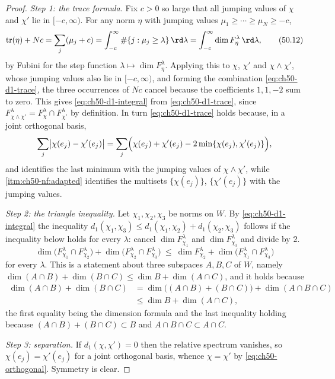 \begin{proof}
\emph{Step 1: the trace formula.}  Fix $c>0$ so large that all jumping
values of $\chi$ and $\chi'$ lie in $[-c,\infty)$.  For any norm
$\eta$ with jumping values $\mu_1\ge\cdots\ge\mu_N\ge-c$,
\[
 \operatorname{tr}(\eta)+Nc
 =\sum_j(\mu_j+c)
 =\int_{-c}^{\infty}\#\{j:\mu_j\ge\lambda\}\,\rd\lambda
 =\int_{-c}^{\infty}\dim F^\lambda_\eta\,\rd\lambda,
\tag{50.12}\label{eq:ch50-trace-layer}
\]
by Fubini for the step function $\lambda\mapsto\dim F^\lambda_\eta$.
Applying this to $\chi$, $\chi'$ and $\chi\wedge\chi'$, whose jumping
values also lie in $[-c,\infty)$, and forming the combination
\eqref{eq:ch50-d1-trace}, the three occurrences of $Nc$ cancel because
the coefficients $1,1,-2$ sum to zero.  This gives
\eqref{eq:ch50-d1-integral} from \eqref{eq:ch50-d1-trace}, since
$F^\lambda_{\chi\wedge\chi'}=F^\lambda_\chi\cap F^\lambda_{\chi'}$ by
definition.  In turn \eqref{eq:ch50-d1-trace} holds because, in a joint
orthogonal basis,
\[
 \sum_j\bigl|\chi(e_j)-\chi'(e_j)\bigr|
 =\sum_j\Bigl(\chi(e_j)+\chi'(e_j)
      -2\min\{\chi(e_j),\chi'(e_j)\}\Bigr),
\]
and  identifies the last minimum with the jumping
values of $\chi\wedge\chi'$, while
\,\cref{itm:ch50-nf:adapted} identifies
the multisets $\{\chi(e_j)\}$, $\{\chi'(e_j)\}$ with the jumping
values.

\emph{Step 2: the triangle inequality.}  Let $\chi_1,\chi_2,\chi_3$ be
norms on $W$.  By \eqref{eq:ch50-d1-integral} the inequality
$d_1(\chi_1,\chi_3)\le d_1(\chi_1,\chi_2)+d_1(\chi_2,\chi_3)$ follows
if the inequality below holds for every $\lambda$: cancel
$\dim F_{\chi_1}^\lambda$ and $\dim F^\lambda_{\chi_3}$ and divide by $2$.
\[
 \dim\bigl(F^\lambda_{\chi_1}\cap F^\lambda_{\chi_2}\bigr)
 +\dim\bigl(F^\lambda_{\chi_2}\cap F^\lambda_{\chi_3}\bigr)
 \ \le\
 \dim F^\lambda_{\chi_2}
 +\dim\bigl(F^\lambda_{\chi_1}\cap F^\lambda_{\chi_3}\bigr)
\tag{50.13}\label{eq:ch50-three-subspaces}
\]
for every $\lambda$.  This is a statement about three subspaces
$A,B,C$ of $W$, namely
$\dim(A\cap B)+\dim(B\cap C)\le\dim B+\dim(A\cap C)$, and it holds
because
\[
 \begin{split}
 \dim(A\cap B)+\dim(B\cap C)
 &=\dim\bigl((A\cap B)+(B\cap C)\bigr)+\dim(A\cap B\cap C)\\
 &\le\dim B+\dim(A\cap C),
 \end{split}
\]
the first equality being the dimension formula and the last inequality
holding because $(A\cap B)+(B\cap C)\subset B$ and
$A\cap B\cap C\subset A\cap C$.

\emph{Step 3: separation.}  If $d_1(\chi,\chi')=0$ then the relative
spectrum vanishes, so $\chi(e_j)=\chi'(e_j)$ for a joint orthogonal
basis, whence $\chi=\chi'$ by \eqref{eq:ch50-orthogonal}.  Symmetry is
clear.
\end{proof}

